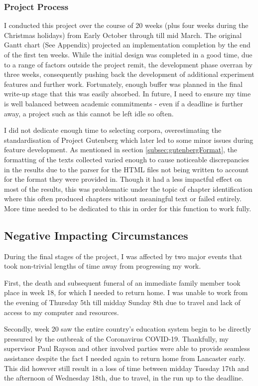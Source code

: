\documentclass{article}
\begin{document}
{        \subsubsection{Project Process}
            I conducted this project over the course of 20 weeks (plus four weeks during the Christmas holidays) from Early October through till mid March. The original Gantt chart (See Appendix) projected an implementation completion by the end of the first ten weeks. While the initial design was completed in a good time, due to a range of factors outside the project remit, the development phase overran by three weeks, consequently pushing back the development of additional experiment features and further work. Fortunately, enough buffer was planned in the final write-up stage that this was easily absorbed. In future, I need to ensure my time is well balanced between academic commitments - even if a deadline is further away, a project such as this cannot be left idle so often.

            I did not dedicate enough time to selecting corpora, overestimating the standardisation of Project Gutenberg which later led to some minor issues during feature development. As mentioned in section \ref{subsec:gutenbergFormat}, the formatting of the texts collected varied enough to cause noticeable discrepancies in the results due to the parser for the HTML files not being written to account for the format they were provided in. Though it had a less impactful effect on most of the results, this was problematic under the topic of chapter identification where this often produced chapters without meaningful text or failed entirely. More time needed to be dedicated to this in order for this function to work fully.
    \subsection{Negative Impacting Circumstances}
        During the final stages of the project, I was affected by two major events that took non-trivial lengths of time away from progressing my work.

        First, the death and subsequent funeral of an immediate family member took place in week 18, for which I needed to return home. I was unable to work from the evening of Thursday 5th till midday Sunday 8th due to travel and lack of access to my computer and resources.

        Secondly, week 20 saw the entire country's education system begin to be directly pressured by the outbreak of the Coronavirus COVID-19. Thankfully, my supervisor Paul Rayson and other involved parties were able to provide seamless assistance despite the fact I needed again to return home from Lancaster early. This did however still result in a loss of time between midday Tuesday 17th and the afternoon of Wednesday 18th, due to travel, in the run up to the deadline.
}
\end{document}
